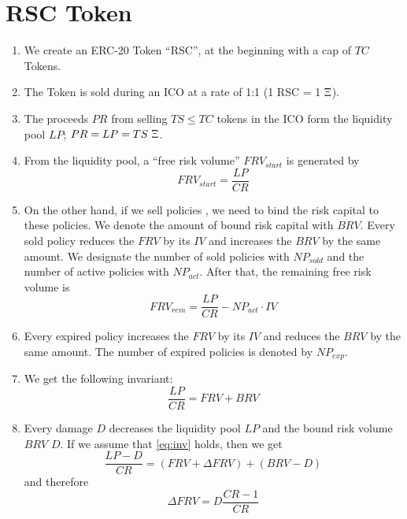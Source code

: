 \documentclass[runningheads,a4paper]{llncs}
\newcommand{\ETH}{$\Upxi$}
\begin{document}
\section{RSC Token}

\begin{enumerate}
    \item We create an ERC-20 Token ``RSC'', at the beginning with a cap of $TC$ Tokens.
    \item The Token is sold during an ICO at a rate of 1:1 (1 RSC = 1 \ETH).
    \item The proceeds $PR$ from selling $TS \le TC$ tokens in the ICO form the liquidity pool $LP$; $PR = LP = TS\ \Upxi$.
    \item From the liquidity pool, a ``free risk volume'' $FRV_{start}$ is generated by
    \begin{equation} \label{eq:FRV_start} FRV_{start} = \frac{LP}{CR} \end{equation}
    \item On the other hand, if we sell policies , we need to bind the risk capital to these policies.
    We denote the amount of bound risk capital with $BRV$. 
    Every sold policy reduces the $FRV$ by its $IV$ and increases the $BRV$ by the same amount.
    We designate the number of sold policies with $NP_{sold}$ and the number of active policies with $NP_{act}$. 
    After that, the remaining free risk volume is
    \begin{equation} \label{eq:FRV_rem} FRV_{rem} = \frac{LP}{CR} - NP_{act} \cdot IV \end{equation}
    \item Every expired policy increases the $FRV$ by its $IV$ and reduces the $BRV$ by the same amount. 
    The number of expired policies is denoted by $NP_{exp}$.
    \item We get the following invariant: 
    \begin{equation} \label{eq:inv} \frac{LP}{CR} = {FRV} + {BRV} \end{equation}
    \item Every damage $D$ decreases the liquidity pool $LP$ and the bound risk volume $BRV$ $D$. 
    If we assume that \eqref{eq:inv} holds, then we get
    \begin{equation} \label{eq:delta_FRV} \frac{LP - D}{CR} = ({FRV} + \Delta {FRV})  + ({BRV} - {D}) \end{equation}    
    and therefore
    \begin{equation} \label{eq:delta_FRV2} \Delta {FRV} = {D} \frac{CR-1}{CR} \end{equation}

\end{enumerate}
\end{document}
